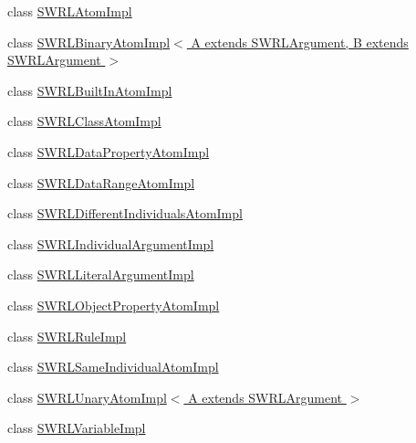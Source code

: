\begin{DoxyCompactItemize}
class \hyperlink{classuk_1_1ac_1_1manchester_1_1cs_1_1owl_1_1owlapi_1_1_s_w_r_l_atom_impl}{S\-W\-R\-L\-Atom\-Impl}
\item 
class \hyperlink{classuk_1_1ac_1_1manchester_1_1cs_1_1owl_1_1owlapi_1_1_s_w_r_l_binary_atom_impl_3_01_a_01extends733cb0b232fc39d6f31ee5b88a06cbcc}{S\-W\-R\-L\-Binary\-Atom\-Impl$<$ A extends S\-W\-R\-L\-Argument, B extends S\-W\-R\-L\-Argument $>$}
\item 
class \hyperlink{classuk_1_1ac_1_1manchester_1_1cs_1_1owl_1_1owlapi_1_1_s_w_r_l_built_in_atom_impl}{S\-W\-R\-L\-Built\-In\-Atom\-Impl}
\item 
class \hyperlink{classuk_1_1ac_1_1manchester_1_1cs_1_1owl_1_1owlapi_1_1_s_w_r_l_class_atom_impl}{S\-W\-R\-L\-Class\-Atom\-Impl}
\item 
class \hyperlink{classuk_1_1ac_1_1manchester_1_1cs_1_1owl_1_1owlapi_1_1_s_w_r_l_data_property_atom_impl}{S\-W\-R\-L\-Data\-Property\-Atom\-Impl}
\item 
class \hyperlink{classuk_1_1ac_1_1manchester_1_1cs_1_1owl_1_1owlapi_1_1_s_w_r_l_data_range_atom_impl}{S\-W\-R\-L\-Data\-Range\-Atom\-Impl}
\item 
class \hyperlink{classuk_1_1ac_1_1manchester_1_1cs_1_1owl_1_1owlapi_1_1_s_w_r_l_different_individuals_atom_impl}{S\-W\-R\-L\-Different\-Individuals\-Atom\-Impl}
\item 
class \hyperlink{classuk_1_1ac_1_1manchester_1_1cs_1_1owl_1_1owlapi_1_1_s_w_r_l_individual_argument_impl}{S\-W\-R\-L\-Individual\-Argument\-Impl}
\item 
class \hyperlink{classuk_1_1ac_1_1manchester_1_1cs_1_1owl_1_1owlapi_1_1_s_w_r_l_literal_argument_impl}{S\-W\-R\-L\-Literal\-Argument\-Impl}
\item 
class \hyperlink{classuk_1_1ac_1_1manchester_1_1cs_1_1owl_1_1owlapi_1_1_s_w_r_l_object_property_atom_impl}{S\-W\-R\-L\-Object\-Property\-Atom\-Impl}
\item 
class \hyperlink{classuk_1_1ac_1_1manchester_1_1cs_1_1owl_1_1owlapi_1_1_s_w_r_l_rule_impl}{S\-W\-R\-L\-Rule\-Impl}
\item 
class \hyperlink{classuk_1_1ac_1_1manchester_1_1cs_1_1owl_1_1owlapi_1_1_s_w_r_l_same_individual_atom_impl}{S\-W\-R\-L\-Same\-Individual\-Atom\-Impl}
\item 
class \hyperlink{classuk_1_1ac_1_1manchester_1_1cs_1_1owl_1_1owlapi_1_1_s_w_r_l_unary_atom_impl_3_01_a_01extends_01_s_w_r_l_argument_01_4}{S\-W\-R\-L\-Unary\-Atom\-Impl$<$ A extends S\-W\-R\-L\-Argument $>$}
\item 
class \hyperlink{classuk_1_1ac_1_1manchester_1_1cs_1_1owl_1_1owlapi_1_1_s_w_r_l_variable_impl}{S\-W\-R\-L\-Variable\-Impl}
\end{DoxyCompactItemize}

